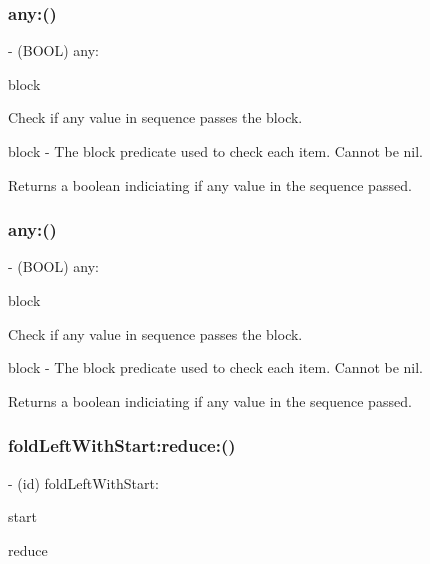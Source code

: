 \subsubsection{\texorpdfstring{any\+:()}{any:()}\hspace{0.1cm}{\footnotesize\ttfamily [2/3]}}
{\footnotesize\ttfamily -\/ (B\+O\+OL) any\+: \begin{DoxyParamCaption}\item[{(B\+O\+OL($^\wedge$)(id value))}]{block }\end{DoxyParamCaption}}

Check if any value in sequence passes the block.

block -\/ The block predicate used to check each item. Cannot be nil.

Returns a boolean indiciating if any value in the sequence passed. \mbox{\label{interface_r_a_c_sequence_abbd3bd6ea0a255fe346d8430b2cc586c}} 
\subsubsection{\texorpdfstring{any\+:()}{any:()}\hspace{0.1cm}{\footnotesize\ttfamily [3/3]}}
{\footnotesize\ttfamily -\/ (B\+O\+OL) any\+: \begin{DoxyParamCaption}\item[{(B\+O\+OL($^\wedge$)(id value))}]{block }\end{DoxyParamCaption}}

Check if any value in sequence passes the block.

block -\/ The block predicate used to check each item. Cannot be nil.

Returns a boolean indiciating if any value in the sequence passed. \mbox{\label{interface_r_a_c_sequence_a75b99901f0b8566a49eaee2099df7738}} 
\subsubsection{\texorpdfstring{fold\+Left\+With\+Start\+:reduce\+:()}{foldLeftWithStart:reduce:()}\hspace{0.1cm}{\footnotesize\ttfamily [1/3]}}
{\footnotesize\ttfamily -\/ (id) fold\+Left\+With\+Start\+: \begin{DoxyParamCaption}\item[{(id)}]{start }\item[{reduce:(id($^\wedge$)(id accumulator, id value))}]{reduce }\end{DoxyParamCaption}}

